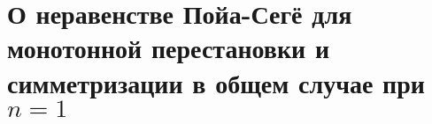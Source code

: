 \chapter{О неравенстве Пойа-Сегё для монотонной перестановки и симметризации в общем случае при $n = 1$}
\label{chapt2}








